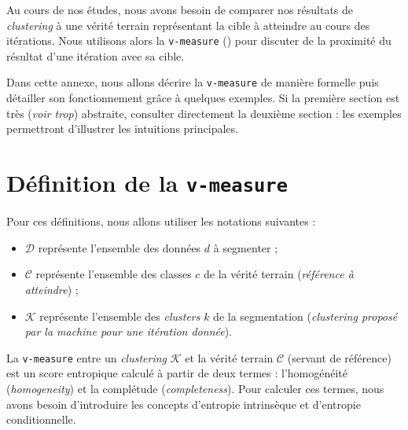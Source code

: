 \DontFrameThisInToc
{}
\label{annex:D-ANNEXE-EVALUATION-CLUSTERING}

	Au cours de nos études, nous avons besoin de comparer nos résultats de \textit{clustering} à une vérité terrain représentant la cible à atteindre au cours des itérations.
	Nous utilisons alors la \texttt{v-measure} (\cite{rosenberg-hirschberg:2007:vmeasure-conditional-entropybased}) pour discuter de la proximité du résultat d'une itération avec sa cible.
	
	\begin{leftBarAuthorOpinion}
		Dans cette annexe, nous allons décrire la \texttt{v-measure} de manière formelle puis détailler son fonctionnement grâce à quelques exemples.
		Si la première section est très (\textit{voir trop}) abstraite, consulter directement la deuxième section : les exemples permettront d'illustrer les intuitions principales.
	\end{leftBarAuthorOpinion}
	
	\minitoc

	\newpage
	\section{Définition de la \texttt{v-measure}}
	\label{annex:D.1-ANNEXE-EVALUATION-CLUSTERING-DEFINITION}
		
		Pour ces définitions, nous allons utiliser les notations suivantes :
		\begin{itemize}
			\item $\mathcal{D}$ représente l'ensemble des données $d$ à segmenter ;
			\item $\mathcal{C}$ représente l'ensemble des classes $c$ de la vérité terrain (\textit{référence à atteindre}) ;
			\item $\mathcal{K}$ représente l'ensemble des \textit{clusters} $k$ de la segmentation (\textit{clustering proposé par la machine pour une itération donnée}).
		\end{itemize}
		
		
		La \texttt{v-measure} entre un \textit{clustering} $\mathcal{K}$ et la vérité terrain $\mathcal{C}$ (servant de référence) est un score entropique calculé à partir de deux termes : l'homogénéité (\textit{homogeneity}) et la complétude (\textit{completeness}).
		Pour calculer ces termes, nous avons besoin d'introduire les concepts d'entropie intrinsèque et d'entropie conditionnelle.
		\newline
		

